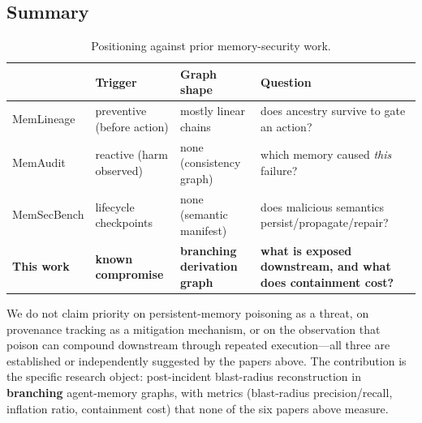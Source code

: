 \subsection{Summary}

\begin{table}[h]
\centering
\caption{Positioning against prior memory-security work.}
\label{tab:related-work-summary}
\begin{tabular}{p{1.4cm}p{1.5cm}p{1.6cm}p{2.5cm}}
\toprule
 & Trigger & Graph shape & Question \\
\midrule
MemLineage & preventive (before action) & mostly linear chains & does ancestry survive to gate an action? \\
MemAudit & reactive (harm observed) & none (consistency graph) & which memory caused \emph{this} failure? \\
MemSecBench & lifecycle checkpoints & none (semantic manifest) & does malicious semantics persist/propagate/repair? \\
\textbf{This work} & \textbf{known compromise} & \textbf{branching derivation graph} & \textbf{what is exposed downstream, and what does containment cost?} \\
\bottomrule
\end{tabular}
\end{table}

We do not claim priority on persistent-memory poisoning as a threat, on
provenance tracking as a mitigation mechanism, or on the observation
that poison can compound downstream through repeated execution---all
three are established or independently suggested by the papers above.
The contribution is the specific research object: post-incident
blast-radius reconstruction in \textbf{branching} agent-memory graphs,
with metrics (blast-radius precision/recall, inflation ratio,
containment cost) that none of the six papers above measure.
